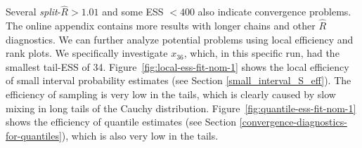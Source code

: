 \documentclass[american,]{article}
\begin{document}


Several \emph{split}-\(\widehat{R}>1.01\) and some ESS \(<400\)
also indicate convergence problems. The online appendix contains more results 
with longer chains and other \(\widehat{R}\) diagnostics.
%
We can further analyze potential problems using local efficiency and
rank plots. We specifically investigate \(x_{36}\), which, in this
specific run, had the smallest tail-ESS of 34. 
Figure~\ref{fig:local-ess-fit-nom-1} shows the local efficiency of small 
interval probability estimates (see Section \ref{small_interval_S_eff}).
The efficiency of sampling is very low in the tails, which is clearly
caused by slow mixing in long tails of the Cauchy distribution.  
%
Figure~\ref{fig:quantile-ess-fit-nom-1} shows the efficiency
of quantile estimates (see Section \ref{convergence-diagnostics-for-quantiles}), 
which is also very low in the tails. 
\end{document}
